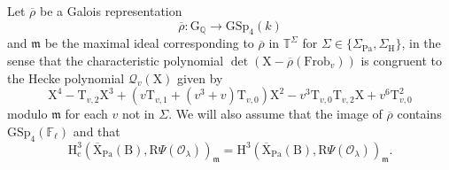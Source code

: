 \documentclass[10pt]{amsart}
\numberwithin{equation}{section}
\theoremstyle{definition}
\def\GSp{\mathrm{GSp}}
\def\Pa{\mathrm{Pa}}
\def\Frob{\mathrm{Frob}}
\def\calO{\mathcal{O}}
\def\fracm{\mathfrak{m}}
\def\FF{\mathbb{F}}
\def\QQ{\mathbb{Q}}
\def\TT{\mathbb{T}}
\def\rmc{\mathrm{c}}
\def\rmB{\mathrm{B}}
\def\rmG{\mathrm{G}}
\def\rmH{\mathrm{H}}
\def\rmR{\mathrm{R}}
\def\rmX{\mathrm{X}}
\def\rmT{\mathrm{T}}
\begin{document}
Let $\overline{\rho}$ be a Galois representation 
\begin{equation*}
\overline{\rho}: \rmG_{\QQ}\rightarrow \GSp_{4}(k)
\end{equation*}
and $\fracm$ be the maximal ideal corresponding to $\overline{\rho}$ in $\TT^{\Sigma}$ for $\Sigma\in \{\Sigma_{\Pa}, \Sigma_{\rmH}\}$, in the sense that the characteristic polynomial $\det(\rmX-\overline{\rho}(\Frob_{v}))$ is congruent to the Hecke polynomial $\mathcal{Q}_{v}(\rmX)$ given by
\begin{equation*}
\rmX^{4}-\rmT_{v,2}\rmX^{3}+(v\rmT_{v,1}+(v^{3}+v)\rmT_{v, 0})\rmX^{2}-v^{3}\rmT_{v, 0}\rmT_{v, 2}\rmX+v^{6}\rmT^{2}_{v, 0}
\end{equation*}
modulo $\fracm$ for each $v$ not in $\Sigma$. We will also assume that the image of $\overline{\rho}$ contains $\GSp_{4}(\FF_{\ell})$ and that
\begin{equation*}
\rmH^{3}_{\rmc}(\overline{\rmX}_{\Pa}(\rmB), \rmR\Psi(\calO_{\lambda}))_{\fracm}=\rmH^{3}(\overline{\rmX}_{\Pa}(\rmB), \rmR\Psi(\calO_{\lambda}))_{\fracm}.
\end{equation*}
\end{document}
